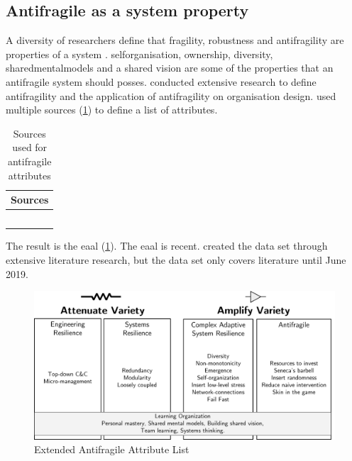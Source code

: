 \subsection{Antifragile as a system property}
\label{sub:backgroundafpropertyofsystem}
A diversity of researchers define that \gls{fragility}, \gls{robustness} and \gls{antifragility} are properties of a system \parencites{Jaaron2014}{Hole2016}{Kastner2017}{OReilly2019}{Botjes2021}. \Gls{selforganisation}, ownership, \gls{diversity}, \glspl{sharedmentalmodel} and a shared vision are some of the properties that an \gls{antifragile} system should posses. \textcite{Botjes2021} conducted extensive research to define \gls{antifragility} and the application of \gls{antifragility} on organisation design. \citeauthor{Botjes2021} used multiple sources (\cref{tab:tbsourcesofantifragileattributes}) to define a list of attributes.
\begin{table}[H]
	\centering
	\begin{tabular}{@{}p{}p{}@{}}
		\toprule
		\multicolumn{2}{c}{\textbf{Sources}} \\%
		\midrule
		\textcite{Ghasemi2017} & \textcite{Johnson2013} \\%
		\textcite{Kennon2015} & \textcite{Markey2018} \\%
		\textcite{Hendriksson2016} & \textcite{Kastner2017} \\%
		\textcite{Gorgeon2015} & \textcite{Hole2016} \\%
		\textcite{OReilly2019} & \\%
		\bottomrule
	\end{tabular}%
	\caption[Sources used for antifragile attributes \parencite{Botjes2021}]{Sources used for antifragile attributes \parencite{Botjes2021}}
	\label{tab:tbsourcesofantifragileattributes}%
\end{table}%
The result is the \acrfull{eaal} (\cref{fig:eaalbw}). The \acrfull{eaal} is recent. \textcite[p.~5]{Botjes2021} created the data set through extensive literature research, but the data set only covers literature until June 2019. 
\begin{figure}[H]
	\centering
	\includegraphics[width=0.8\linewidth]{images/eaalbw}
	\caption[Extended Antifragile Attribute List \parencite{Botjes2021}]{Extended Antifragile Attribute List \Parencite{Botjes2021}}
	\label{fig:eaalbw}
\end{figure}
